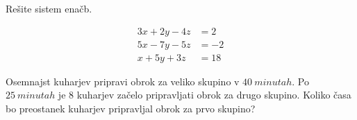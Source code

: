 \documentclass[addpoints]{exam}
\begin{document}
\begin{questions}
        \question
        Rešite sistem enačb.

        $$ \begin{aligned}
            3x+2y-4z&=2 \\ 5x-7y-5z&=-2 \\ x+5y+3z&=18
        \end{aligned} $$
    
        
    

    \question
        Osemnajst kuharjev pripravi obrok za veliko skupino v $40~minutah$. Po $25~minutah$ je $8$ kuharjev začelo pripravljati obrok za drugo skupino. Koliko časa bo preostanek kuharjev pripravljal obrok za prvo skupino?
    

\end{questions}
\end{document}
